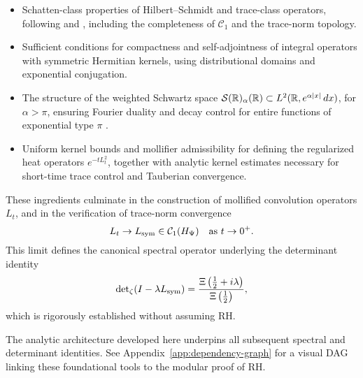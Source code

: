\begin{itemize}
    \item Schatten-class properties of Hilbert--Schmidt and trace-class operators, following \cite[Ch.~4]{Simon2005TraceIdeals} and \cite[Ch.~VI]{ReedSimon1980I}, including the completeness of \( \mathcal{C}_1 \) and the trace-norm topology.

    \item Sufficient conditions for compactness and self-adjointness of integral operators with symmetric Hermitian kernels, using distributional domains and exponential conjugation.

    \item The structure of the weighted Schwartz space \( \mathcal{S}(\mathbb{R})_\alpha(\mathbb{R}) \subset L^2(\mathbb{R}, e^{\alpha |x|}\, dx) \), for \( \alpha > \pi \), ensuring Fourier duality and decay control for entire functions of exponential type \( \pi \) \cite{Levin1996EntireLectures}.

    \item Uniform kernel bounds and mollifier admissibility for defining the regularized heat operators \( e^{-t L_t^2} \), together with analytic kernel estimates necessary for short-time trace control and Tauberian convergence.
\end{itemize}

These ingredients culminate in the construction of mollified convolution operators \( L_t \), and in the verification of trace-norm convergence
\[
L_t \to L_{\mathrm{sym}} \in \mathcal{C}_1(H_{\Psi}) \quad \text{as } t \to 0^+.
\]
This limit defines the canonical spectral operator underlying the determinant identity
\[
\det\nolimits_\zeta(I - \lambda L_{\mathrm{sym}}) = \frac{\Xi\left(\tfrac{1}{2} + i\lambda\right)}{\Xi\left(\tfrac{1}{2}\right)},
\]
which is rigorously established without assuming RH.

\medskip

The analytic architecture developed here underpins all subsequent spectral and determinant identities.
See Appendix~\ref{app:dependency-graph} for a visual DAG linking these foundational tools to the modular proof of RH.
